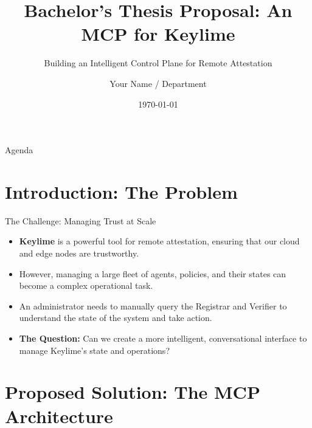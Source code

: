\documentclass{beamer}
\title{Bachelor's Thesis Proposal: An MCP for Keylime}
\subtitle{Building an Intelligent Control Plane for Remote Attestation}
\author{Your Name / Department}
\institute{Your University}
\date{\today}
\begin{document}
\begin{frame}
  \titlepage
\end{frame}

\begin{frame}{Agenda}
  \tableofcontents
\end{frame}

\section{Introduction: The Problem}

\begin{frame}{The Challenge: Managing Trust at Scale}
    \begin{itemize}
        \item \textbf{Keylime} is a powerful tool for remote attestation, ensuring that our cloud and edge nodes are trustworthy.
        \vspace{1em}
        \item However, managing a large fleet of agents, policies, and their states can become a complex operational task.
        \vspace{1em}
        \item An administrator needs to manually query the Registrar and Verifier to understand the state of the system and take action.
        \vspace{1em}
        \item \textbf{The Question:} Can we create a more intelligent, conversational interface to manage Keylime's state and operations?
    \end{itemize}
\end{frame}

\section{Proposed Solution: The MCP Architecture}
\end{document}

